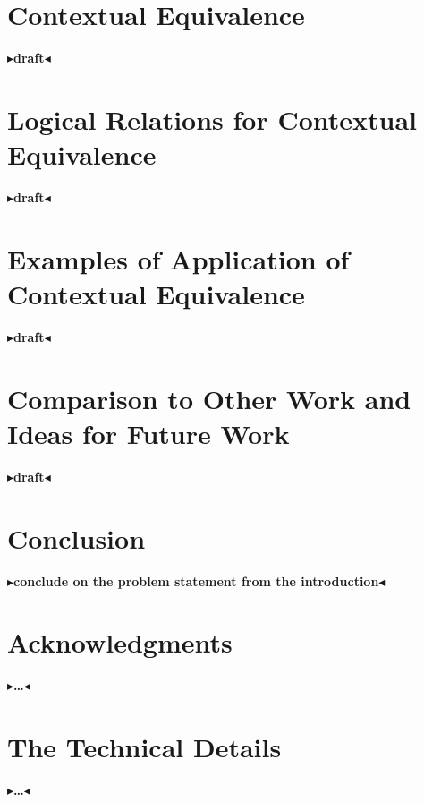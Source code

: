 \documentclass[twoside,11pt,openright]{report}
\newcommand{\todo}[1]{{\color[rgb]{.5,0,0}\textbf{$\blacktriangleright$#1$\blacktriangleleft$}}}
\begin{document}

\chapter{Contextual Equivalence}
\label{ch:CE}

\todo{draft}


\chapter{Logical Relations for Contextual Equivalence}
\label{ch:LR}

\todo{draft}


\chapter{Examples of Application of Contextual Equivalence}
\label{ch:ACE}

\todo{draft}


\chapter{Comparison to Other Work and Ideas for Future Work}
\label{ch:COWFW}

\todo{draft}


\chapter{Conclusion}
\label{ch:conclusion}

\todo{conclude on the problem statement from the introduction}

\chapter*{Acknowledgments}

\todo{\dots}


\cleardoublepage
{}
 



\cleardoublepage
\appendix
\chapter{The Technical Details}

\todo{\dots}
\end{document}
